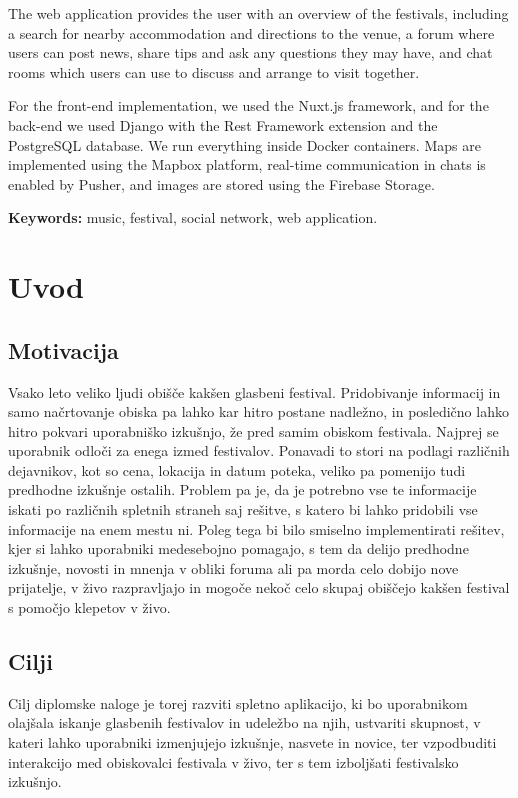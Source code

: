\documentclass[a4paper,12pt,openright]{book}
\newcommand{\tkeywordsEn}{music, festival, social network, web application}
\newcommand{\clearemptydoublepage}{\newpage{\pagestyle{empty}\cleardoublepage}}
\begin{document}
The web application provides the user with an overview of the festivals, including a search for nearby accommodation and directions to the venue, a forum where users can
post news, share tips and ask any questions they may have, and chat rooms which users can use to discuss and arrange to visit together. 

For the front-end implementation, we used the Nuxt.js framework, and for the back-end we used Django with the Rest Framework extension and the PostgreSQL database. 
We run everything inside Docker containers. Maps are implemented using the Mapbox platform, real-time communication in chats is enabled by Pusher, and images are stored using the Firebase Storage.

\bigskip

\noindent\textbf{Keywords:} \tkeywordsEn.
\clearemptydoublepage

\mainmatter
\setcounter{page}{1}
\pagestyle{fancy}

\chapter{Uvod}
\section{Motivacija}
Vsako leto veliko ljudi obišče kakšen glasbeni festival. Pridobivanje informacij in samo načrtovanje obiska pa lahko kar hitro postane nadležno, 
in posledično lahko hitro pokvari uporabniško izkušnjo, že pred samim obiskom festivala.
Najprej se uporabnik odloči za enega izmed festivalov.
Ponavadi to stori na podlagi različnih dejavnikov, kot so cena, lokacija in datum poteka, veliko pa pomenijo tudi predhodne izkušnje ostalih.
Problem pa je, da je potrebno vse te informacije iskati po različnih spletnih straneh saj rešitve, s katero bi lahko pridobili vse informacije na enem mestu ni. 
Poleg tega bi bilo smiselno implementirati rešitev, kjer si lahko uporabniki medesebojno pomagajo, 
s tem da delijo predhodne izkušnje, novosti in mnenja v obliki foruma ali pa morda celo dobijo nove prijatelje, v živo razpravljajo in mogoče nekoč celo skupaj
obiščejo kakšen festival s pomočjo klepetov v živo. 

\section{Cilji}
Cilj diplomske naloge je torej razviti spletno aplikacijo, ki bo uporabnikom olajšala iskanje glasbenih festivalov in udeležbo na njih, 
ustvariti skupnost, v kateri lahko uporabniki izmenjujejo izkušnje, nasvete in novice,
ter vzpodbuditi interakcijo med obiskovalci festivala v živo, ter s tem izboljšati festivalsko izkušnjo.
\end{document}
